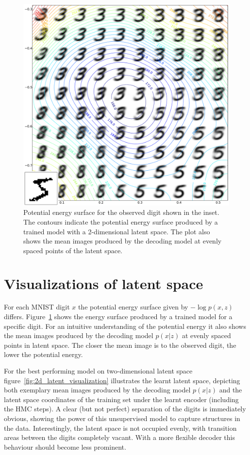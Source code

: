 \begin{appendices}
\begin{figure}[hb]
\centering
\includegraphics[width=\columnwidth]{figures/vae_pot_energy_example.pdf}
\caption{Potential energy surface for the observed digit shown in the inset. The contours indicate the potential energy surface produced by a trained model with a 2-dimensional latent space. The plot also shows the mean images produced by the decoding model at evenly spaced points of the latent space.}
\label{fig:EnergySurfaceMNIST}
\end{figure}

\section{Visualizations of latent space}
\label{app:LatentVisualizations}

For each MNIST digit $x$ the potential energy surface given by $-\log p(x, z)$ differs. Figure~\ref{fig:EnergySurfaceMNIST} shows the energy surface produced by a trained model for a specific digit. For an intuitive understanding of the potential energy it also shows the mean images produced by the decoding model $p(x|z)$ at evenly spaced points in latent space. The closer the mean image is to the observed digit, the lower the potential energy.

For the best performing model on two-dimensional latent space figure~\ref{fig:2d_latent_visualization} illustrates the learnt latent space, depicting both exemplary mean images produced by the decoding model $p(x|z)$ and the latent space coordinates of the training set under the learnt encoder (including the HMC steps). A clear (but not perfect) separation of the digits is immediately obvious, showing the power of this unsupervised model to capture structures in the data. Interestingly, the latent space is not occupied evenly, with transition areas between the digits completely vacant. With a more flexible decoder this behaviour should become less prominent.


\end{appendices}
